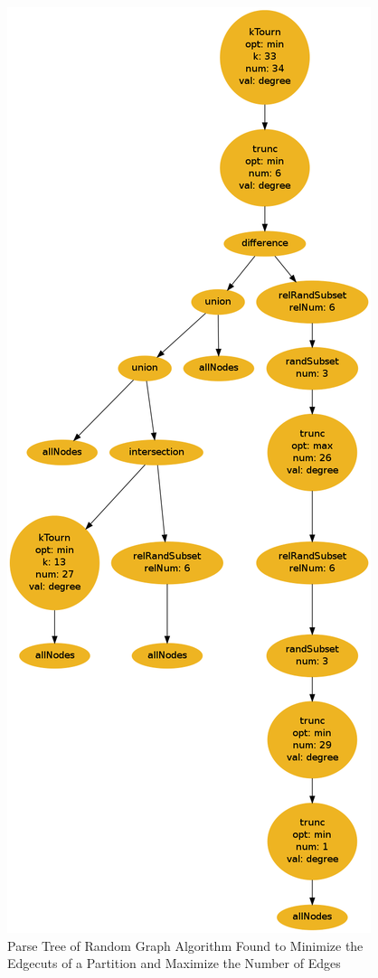 \documentclass{article}
\begin{document}
\begin{figure}
\begin{centering}
  \includegraphics[scale=0.25]{minM.png}
  \caption{Parse Tree of Random Graph Algorithm Found to Minimize the Edgecuts of a Partition and Maximize the Number of Edges}
  \label{fig:minM}
\end{centering}
\end{figure}
\end{document}
